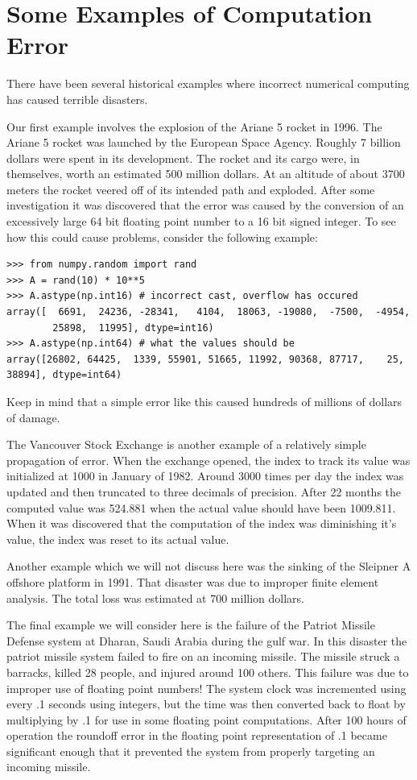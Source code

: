 \section*{Some Examples of Computation Error}

There have been several historical examples where incorrect numerical computing has caused terrible disasters.

Our first example involves the explosion of the Ariane 5 rocket in 1996.
The Ariane 5 rocket was launched by the European Space Agency.
Roughly 7 billion dollars were spent in its development.
The rocket and its cargo were, in themselves, worth an estimated 500 million dollars.
At an altitude of about 3700 meters the rocket veered off of its intended path and exploded.
After some investigation it was discovered that the error was caused by the conversion of an excessively large 64 bit floating point number to a 16 bit signed integer.
To see how this could cause problems, consider the following example:
\begin{lstlisting}
>>> from numpy.random import rand
>>> A = rand(10) * 10**5
>>> A.astype(np.int16) # incorrect cast, overflow has occured
array([  6691,  24236, -28341,   4104,  18063, -19080,  -7500,  -4954,
        25898,  11995], dtype=int16)
>>> A.astype(np.int64) # what the values should be
array([26802, 64425,  1339, 55901, 51665, 11992, 90368, 87717,    25, 38894], dtype=int64)
\end{lstlisting}
Keep in mind that a simple error like this caused hundreds of millions of dollars of damage.

The Vancouver Stock Exchange is another example of a relatively simple propagation of error.
When the exchange opened, the index to track its value was initialized at 1000 in January of 1982.
Around 3000 times per day the index was updated and then truncated to three decimals of precision.
After 22 months the computed value was 524.881 when the actual value should have been 1009.811.
When it was discovered that the computation of the index was diminishing it's value, the index was reset to its actual value.

Another example which we will not discuss here was the sinking of the Sleipner A offshore platform in 1991.
That disaster was due to improper finite element analysis.
The total loss was estimated at 700 million dollars.

The final example we will consider here is the failure of the Patriot Missile Defense system at Dharan, Saudi Arabia during the gulf war.
In this disaster the patriot missile system failed to fire on an incoming missile.
The missile struck a barracks, killed 28 people, and injured around 100 others.
This failure was due to improper use of floating point numbers!
The system clock was incremented using every .1 seconds using integers, but the time was then converted back to float by multiplying by .1 for use in some floating point computations.
After 100 hours of operation the roundoff error in the floating point representation of .1 became significant enough that it prevented the system from properly targeting an incoming missile.


